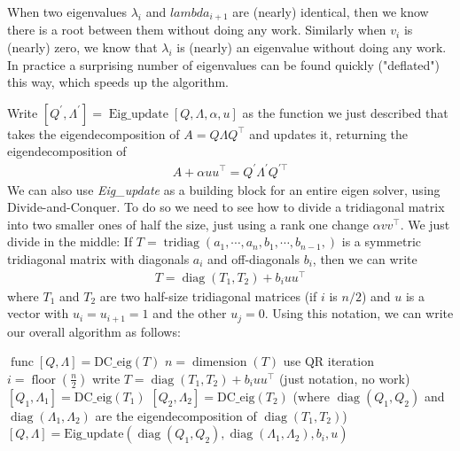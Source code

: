 \documentclass[11pt]{article}
\numberwithin{equation}{section}
\begin{document}
When two eigenvalues $\lambda_i$ and $lambda_{i+1}$ are (nearly) identical, then we know there is a root between them without doing any work. 
Similarly when $v_i$ is (nearly) zero, we know that $\lambda_i$ is (nearly) an eigenvalue without doing any work. 
In practice a surprising number of eigenvalues can be found quickly ("deflated") this way, which speeds up the algorithm.

Write $\left[Q^{\prime}, \Lambda^{\prime}\right] = \operatorname{Eig\_update}[Q, \Lambda, \alpha,u]$ as the function we just
described that takes the eigendecomposition of $A = Q\Lambda Q^\top$ and updates it,
returning the eigendecomposition of \begin{align*}
    A + \alpha uu^\top = Q^{\prime} \Lambda^\prime Q^{\prime\top}
\end{align*}
We can also use \textit{Eig\_update} as a building block for an entire eigen solver, using Divide-and-Conquer. 
To do so we need to see how to divide a tridiagonal matrix into two smaller ones of half the size,
just using a rank one change $\alpha vv^\top$. We just divide in the middle: If $T=\operatorname{tridiag}\left( a_1, \cdots, a_n, b_1, \cdots, b_{n-1},  \right)$ 
is a symmetric tridiagonal matrix with diagonals $a_i$ and off-diagonals $b_i$, then we can write \begin{align*}
    T = \operatorname{diag}(T_1, T_2) + b_i uu^\top 
\end{align*}
where $T_1$ and $T_2$ are two half-size tridiagonal matrices (if $i$ is $n/2$) and $u$ is a vector with $u_i = u_{i+1}=1$ and the other $u_j=0$.
Using this notation, we can write our overall algorithm as follows:
\begin{algorithmfrm}
    \begin{algorithmic}[1]
        \State $\operatorname{func}[Q, \Lambda]=\text{DC\_eig}(T)$
        \State $n = \operatorname{dimension}(T)$
            \State use QR iteration
        \Else \State $i = \operatorname{floor}(\frac{n}{2})$
            \State write $T=\operatorname{diag}(T_1, T_2) + b_i uu^\top$ (just notation, no work)
            \State $[Q_1, \Lambda_1]=\text{DC\_eig}(T_1)$
            \State $[Q_2, \Lambda_2]=\text{DC\_eig}(T_2)$ (where $\operatorname{diag}(Q_1, Q_2)$ and $\operatorname{diag}(\Lambda_1, \Lambda_2)$ are the eigendecomposition of $\operatorname{diag}(T_1, T_2)$)
            \State $[Q, \Lambda]=\text{Eig\_update}\left( \operatorname{diag}(Q_1, Q_2), \operatorname{diag}(\Lambda_1, \Lambda_2), b_i, u \right)$
        \EndIf\\
        \Return
    \end{algorithmic}
\end{algorithmfrm}
\end{document}
